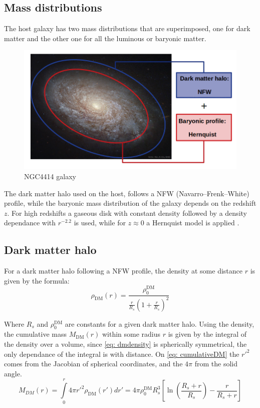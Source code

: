 		
	\subsection{Mass distributions}
		The host galaxy has two mass distributions that are superimposed, one for dark matter and the other one for all the luminous or baryonic matter.
		\begin{figure}[h]
			\centering
			\includegraphics[width=0.7\linewidth]{Figures/NGC4414_modified}
			\caption{NGC4414 galaxy }
		\end{figure}
	
		The dark matter halo used on the host, follows a NFW (Navarro–Frenk–White) profile, while the baryonic mass distribution of the galaxy depends on the redshift $z$. For high redshifts a gaseous disk with constant density followed by a density dependance with $r^{-2.2}$ is used, while for $z \approx 0$ a Hernquist model is applied \cite{choksi2017recoiling}.
		
	\subsection{Dark matter halo}
		For a dark matter halo following a NFW profile, the density at some distance $r$ is given by the formula:
		\begin{equation}\label{eq: dmdensity}
			\rho_\text{DM}(r) = \dfrac{\rho_0^\text{DM}}{\frac{r}{R_s}\left(1 + \frac{r}{R_s}\right)^2}
		\end{equation}
		
		Where $R_s$ and $\rho_0^\text{DM}$ are constants for a given dark matter halo. Using the density, the cumulative mass $M_\text{DM}(r)$ within some radius $r$ is given by the integral of the density over a volume, since \autoref{eq: dmdensity} is spherically symmetrical, the only dependance of the integral is with distance. On \autoref{eq: cumulativeDM} the $r'^2$ comes from the Jacobian of spherical coordinates, and the $4\pi$ from the solid angle.
		\begin{equation}\label{eq: cumulativeDM}
			M_{DM}(r) = \int\limits_0^{r} 4\pi {r'}^2\rho_\text{DM}(r')dr' = 4\pi\rho_0^\text{DM}R_s^3\left[\ln\left(\dfrac{R_s + r}{R_s}\right) - \dfrac{r}{R_s + r}\right]
		\end{equation}
		
